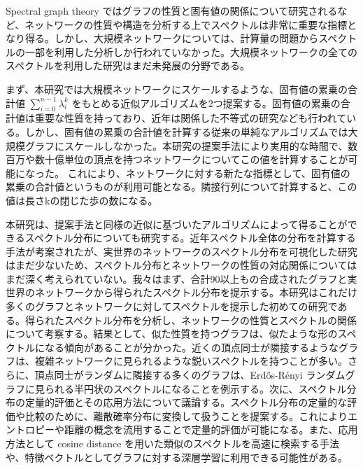 \documentclass[senior,final,11pt]{iscs-thesis}
\begin{document}
\begin{jabstract}
  Spectral graph theory ではグラフの性質と固有値の関係について研究されるなど、ネットワークの性質や構造を分析する上でスペクトルは非常に重要な指標となり得る。しかし、大規模ネットワークについては、計算量の問題からスペクトルの一部を利用した分析しか行われていなかった。大規模ネットワークの全てのスペクトルを利用した研究はまだ未発展の分野である。

  まず、本研究では大規模ネットワークにスケールするような、固有値の累乗の合計値 $\sum_{i=0}^{n-1} \lambda_i^k$ をもとめる近似アルゴリズムを2つ提案する。固有値の累乗の合計値は重要な性質を持っており、近年は関係した不等式の研究なども行われている。しかし、固有値の累乗の合計値を計算する従来の単純なアルゴリズムでは大規模グラフにスケールしなかった。本研究の提案手法により実用的な時間で、数百万や数十億単位の頂点を持つネットワークについてこの値を計算することが可能になった。 これにより、ネットワークに対する新たな指標として、固有値の累乗の合計値というものが利用可能となる。隣接行列について計算すると、この値は長さkの閉じた歩の数になる。

  本研究は、提案手法と同様の近似に基づいたアルゴリズムによって得ることができるスペクトル分布についても研究する。近年スペクトル全体の分布を計算する手法が考案されたが、実世界のネットワークのスペクトル分布を可視化した研究はまだ少ないため、スペクトル分布とネットワークの性質の対応関係についてはまだ深く考えられていない。我々はまず、合計90以上もの合成されたグラフと実世界のネットワークから得られたスペクトル分布を提示する。本研究はこれだけ多くのグラフとネットワークに対してスペクトルを提示した初めての研究である。得られたスペクトル分布を分析し、ネットワークの性質とスペクトルの関係について考察する。結果として、似た性質を持つグラフは、似たような形のスペクトルになる傾向があることが分かった。近くの頂点同士が隣接するようなグラフは、複雑ネットワークに見られるような鋭いスペクトルを持つことが多い。さらに、頂点同士がランダムに隣接する多くのグラフは、Erdős-Rényi ランダムグラフに見られる半円状のスペクトルになることを例示する。次に、スペクトル分布の定量的評価とその応用方法について議論する。スペクトル分布の定量的な評価や比較のために、離散確率分布に変換して扱うことを提案する。これによりエントロピーや距離の概念を流用することで定量的評価が可能になる。また、応用方法として cosine distance を用いた類似のスペクトルを高速に検索する手法や、特徴ベクトルとしてグラフに対する深層学習に利用できる可能性がある。

\end{jabstract}
\maketitle
\end{document}
